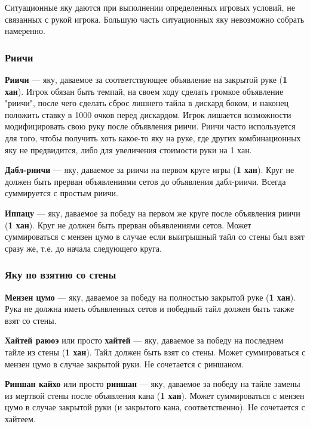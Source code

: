 Ситуационные яку даются при выполнении определенных игровых условий, не связанных с рукой игрока. Большую часть ситуационных яку невозможно собрать намеренно.

\subsubsection{Риичи}

\textbf{Риичи} --- яку, даваемое за соответствующее объявление на закрытой руке (\textbf{1 хан}). Игрок обязан быть темпай, на своем ходу сделать громкое объявление "риичи", после чего сделать сброс лишнего тайла в дискард боком, и наконец положить ставку в 1000 очков перед дискардом. Игрок лишается возможности модифицировать свою руку после объявления риичи. Риичи часто используется для того, чтобы получить хоть какое-то яку на руке, где других комбинационных яку не предвидится, либо для увеличения стоимости руки на 1 хан.

\textbf{Дабл-риичи} --- яку, даваемое за риичи на первом круге игры (\textbf{1 хан}). Круг не должен быть прерван объявлениями сетов до объявления дабл-риичи. Всегда суммируется с простым риичи.

\textbf{Иппацу} --- яку, даваемое за победу на первом же круге после объявления риичи (\textbf{1 хан}). Круг не должен быть прерван объявлениями сетов. Может суммироваться с мензен цумо в случае если выигрышный тайл со стены был взят сразу же, т.е. до начала следующего круга.

\subsubsection{Яку по взятию со стены}

\textbf{Мензен цумо} --- яку, даваемое за победу на полностью закрытой руке (\textbf{1 хан}). Рука не должна иметь объявленных сетов и победный тайл должен быть также взят со стены.

\textbf{Хайтей раюоэ} или просто \textbf{хайтей} --- яку, даваемое за победу на последнем тайле из стены (\textbf{1 хан}). Тайл должен быть взят со стены. Может суммироваться с мензен цумо в случае закрытой руки. Не сочетается с риншаном.

\textbf{Риншан кайхо} или просто \textbf{риншан} --- яку, даваемое за победу на тайле замены из мертвой стены после объявления кана (\textbf{1 хан}). Может суммироваться с мензен цумо в случае закрытой руки (и закрытого кана, соответственно). Не сочетается с хайтеем.

